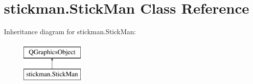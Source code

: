 \hypertarget{classstickman_1_1StickMan}{}\section{stickman.\+Stick\+Man Class Reference}
\label{classstickman_1_1StickMan}
Inheritance diagram for stickman.\+Stick\+Man\+:\begin{figure}[H]
\begin{center}
\leavevmode
\includegraphics[height=2.000000cm]{classstickman_1_1StickMan}
\end{center}
\end{figure}
